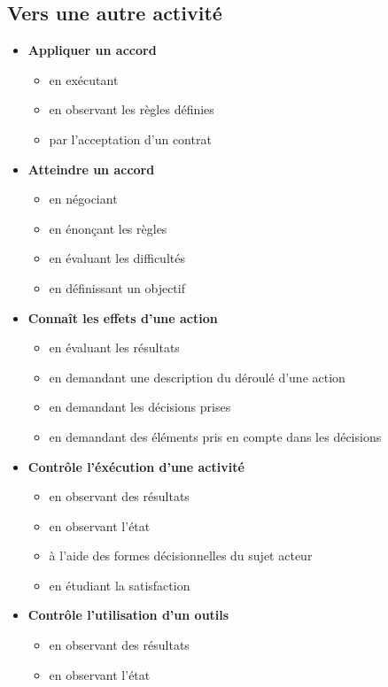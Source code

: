 \documentclass[8pt,a4paper]{article}
\begin{document}
\subsection{Vers une autre activité}
\begin{itemize}
\item \textbf{Appliquer un accord}
\begin{itemize}
\item en exécutant
\item en observant les règles définies
\item par l'acceptation d'un contrat
\\ 
 \end{itemize}
\item \textbf{Atteindre un accord}
\begin{itemize}
\item en négociant
\item en énonçant les règles
\item en évaluant les difficultés
\item en définissant un objectif
\\ 
 \end{itemize}
\item \textbf{Connaît les effets d'une action}
\begin{itemize}
\item en évaluant les résultats
\item en demandant une description du déroulé d'une action
\item en demandant les décisions prises
\item en demandant des éléments pris en compte dans les décisions
\\ 
 \end{itemize}
\item \textbf{Contrôle l'éxécution d'une activité}
\begin{itemize}
\item en observant des résultats
\item en observant l'état
\item à l'aide des formes décisionnelles du sujet acteur
\item en étudiant la satisfaction
\\ 
 \end{itemize}
\item \textbf{Contrôle l'utilisation d'un outils}
\begin{itemize}
\item en observant des résultats
\item en observant l'état

\end{itemize}
\end{itemize}
\end{document}
